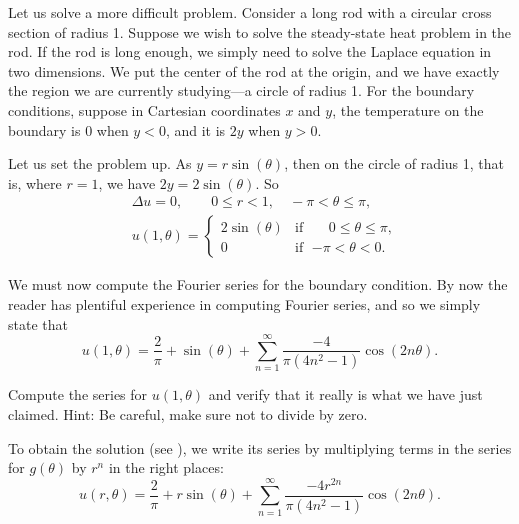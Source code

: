 \begin{example}
Let us solve a more difficult problem.
Consider a long
rod with a circular cross section of radius 1.  Suppose we wish to solve the
steady-state heat problem in the rod.
If the rod is long enough, we simply need to solve
the Laplace equation in two dimensions.  We put the center of the rod at
the origin, and we have exactly the region we are currently
studying---a circle of radius 1.  For the boundary conditions, suppose in
Cartesian coordinates $x$ and
$y$, the temperature on the boundary is 0 when $y < 0$, and it is $2y$ when $y > 0$.

Let us set the problem up.
As $y = r\sin(\theta)$, then on the
circle of radius 1, that is, where $r=1$, we have $2y = 2\sin(\theta)$.  So
\begin{align*}
& \Delta u = 0 , \qquad 0 \leq r < 1, \quad -\pi < \theta \leq \pi,\\
& u(1,\theta) = 
\begin{cases}
2\sin(\theta) & \text{if } \; \phantom{-}0 \leq \theta \leq \pi, \\
0 & \text{if } \; {-\pi} < \theta < 0.
\end{cases}
\end{align*}

We must now compute the Fourier series for the boundary
condition.  By now the reader has plentiful experience in computing
Fourier series, and so we simply state that 
\begin{equation*}
u(1,\theta) = 
\frac{2}{\pi}
+
\sin(\theta)
+
\sum_{n=1}^\infty \frac{-4}{\pi(4n^2-1)} \cos(2n\theta) .
\end{equation*}

\begin{exercise}
Compute the series for $u(1,\theta)$ and verify that it really is what
we have just claimed.  Hint: Be careful, make sure not to divide by zero.
\end{exercise}

To obtain the solution (see ), we
write its series by multiplying terms in the series for $g(\theta)$
by $r^n$ in the right places:
\begin{equation*}
u(r,\theta) = 
\frac{2}{\pi}
+
r\sin(\theta)
+
\sum_{n=1}^\infty \frac{-4r^{2n}}{\pi(4n^2-1)} \cos(2n\theta) .
\end{equation*}
\begin{myfig}
\capstart
{}
\caption{The solution of the Dirichlet problem with
boundary data 0 for $y < 0$ and $2y$ for $y > 0$.\label{dirichdisc:zero2yfig}}
\end{myfig}
\end{example}


